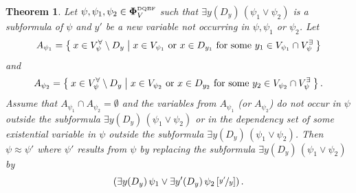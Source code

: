\documentclass[
  digital, %
  twoside, %
  table,   %
  nolof,     %
  nolot,     %
]{fithesis3}
\newtheorem{theorem}{Theorem}[chapter] %
\theoremstyle{definition}
\theoremstyle{remark}
\newcommand{\substitute}[2]{\left[ \nicefrac{#2}{#1} \right]}
\newcommand{\DQBF}[1]{\mathbf{\Phi}_{#1}^{\normalfont{\text{\tiny DQBF}}}}
\newcommand{\vars}[1]{V_{#1}}
\newcommand{\evars}[1]{V_{#1}^{\exists}}
\newcommand{\uvars}[1]{V_{#1}^{\forall}}
\newcommand{\fvars}[1]{V_{#1}^{\mathrm{free}}}
\newcommand{\itholds}{\,}
\begin{document}
\begin{theorem}
  Let $\psi,\psi_1,\psi_2 \in \DQBF{V}$ such that $\exists y(D_y) \itholds (\psi_1 \lor \psi_2)$ is a subformula of $\psi$ and $y'$ be a new variable not occurring in $\psi, \psi_1$ or $\psi_2$. Let 
  \[A_{\psi_1} = \Set{x \in \uvars{\psi} \setminus D_y | x \in \vars{\psi_1} \text{ or } x \in D_{y_1} \text{ for some } y_1 \in \vars{\psi_1} \cap \evars{\psi}}\]
  and 
  \[A_{\psi_2} = \Set{x \in \uvars{\psi} \setminus D_y | x \in \vars{\psi_2} \text{ or } x \in D_{y_2} \text{ for some } y_2 \in \vars{\psi_2} \cap \evars{\psi}}.\] 
  Assume that $A_{\psi_1} \cap A_{\psi_2} = \emptyset$ and the variables from $A_{\psi_1}$ (or $A_{\psi_2}$) do not occur in $\psi$ outside the subformula $\exists y(D_y) \itholds (\psi_1 \lor \psi_2)$ or in the dependency set of some existential variable in $\psi$ outside the subformula $\exists y(D_y) \itholds (\psi_1 \lor \psi_2)$. Then $\psi \approx \psi'$ where $\psi'$ results from $\psi$ by replacing the subformula $\exists y(D_y) \itholds (\psi_1 \lor \psi_2)$ by \[\left(\exists y(D_y) \itholds \psi_1 \lor \exists y'(D_y) \itholds \psi_2\substitute{y}{y'}\right).\]
\end{theorem}
\end{document}
